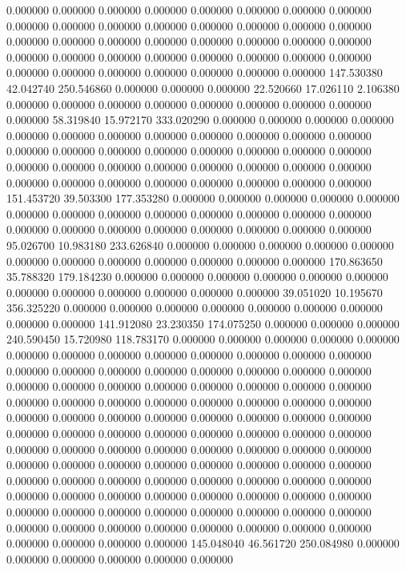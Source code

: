 0.000000 0.000000 0.000000
0.000000 0.000000 0.000000
0.000000 0.000000 0.000000
0.000000 0.000000 0.000000
0.000000 0.000000 0.000000
0.000000 0.000000 0.000000
0.000000 0.000000 0.000000
0.000000 0.000000 0.000000
0.000000 0.000000 0.000000
0.000000 0.000000 0.000000
0.000000 0.000000 0.000000
0.000000 0.000000 0.000000
0.000000 0.000000 0.000000
147.530380 42.042740 250.546860
0.000000 0.000000 0.000000
22.520660 17.026110 2.106380
0.000000 0.000000 0.000000
0.000000 0.000000 0.000000
0.000000 0.000000 0.000000
58.319840 15.972170 333.020290
0.000000 0.000000 0.000000
0.000000 0.000000 0.000000
0.000000 0.000000 0.000000
0.000000 0.000000 0.000000
0.000000 0.000000 0.000000
0.000000 0.000000 0.000000
0.000000 0.000000 0.000000
0.000000 0.000000 0.000000
0.000000 0.000000 0.000000
0.000000 0.000000 0.000000
0.000000 0.000000 0.000000
0.000000 0.000000 0.000000
151.453720 39.503300 177.353280
0.000000 0.000000 0.000000
0.000000 0.000000 0.000000
0.000000 0.000000 0.000000
0.000000 0.000000 0.000000
0.000000 0.000000 0.000000
0.000000 0.000000 0.000000
0.000000 0.000000 0.000000
95.026700 10.983180 233.626840
0.000000 0.000000 0.000000
0.000000 0.000000 0.000000
0.000000 0.000000 0.000000
0.000000 0.000000 0.000000
170.863650 35.788320 179.184230
0.000000 0.000000 0.000000
0.000000 0.000000 0.000000
0.000000 0.000000 0.000000
0.000000 0.000000 0.000000
39.051020 10.195670 356.325220
0.000000 0.000000 0.000000
0.000000 0.000000 0.000000
0.000000 0.000000 0.000000
141.912080 23.230350 174.075250
0.000000 0.000000 0.000000
240.590450 15.720980 118.783170
0.000000 0.000000 0.000000
0.000000 0.000000 0.000000
0.000000 0.000000 0.000000
0.000000 0.000000 0.000000
0.000000 0.000000 0.000000
0.000000 0.000000 0.000000
0.000000 0.000000 0.000000
0.000000 0.000000 0.000000
0.000000 0.000000 0.000000
0.000000 0.000000 0.000000
0.000000 0.000000 0.000000
0.000000 0.000000 0.000000
0.000000 0.000000 0.000000
0.000000 0.000000 0.000000
0.000000 0.000000 0.000000
0.000000 0.000000 0.000000
0.000000 0.000000 0.000000
0.000000 0.000000 0.000000
0.000000 0.000000 0.000000
0.000000 0.000000 0.000000
0.000000 0.000000 0.000000
0.000000 0.000000 0.000000
0.000000 0.000000 0.000000
0.000000 0.000000 0.000000
0.000000 0.000000 0.000000
0.000000 0.000000 0.000000
0.000000 0.000000 0.000000
0.000000 0.000000 0.000000
0.000000 0.000000 0.000000
0.000000 0.000000 0.000000
0.000000 0.000000 0.000000
0.000000 0.000000 0.000000
0.000000 0.000000 0.000000
0.000000 0.000000 0.000000
0.000000 0.000000 0.000000
145.048040 46.561720 250.084980
0.000000 0.000000 0.000000
0.000000 0.000000 0.000000
